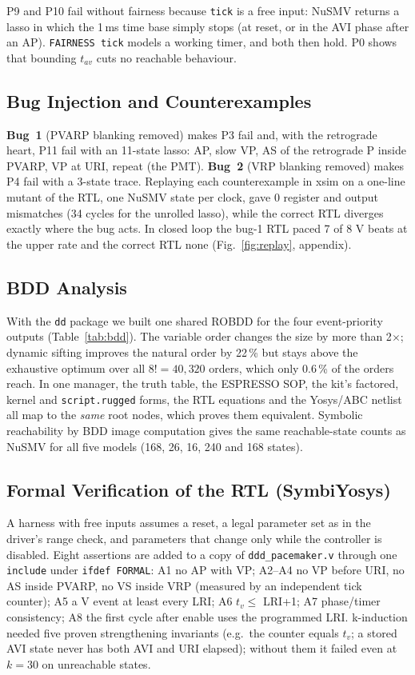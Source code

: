 \documentclass[11pt,a4paper]{article}
\begin{document}
P9 and P10 fail without fairness because \texttt{tick} is a free input: NuSMV returns a lasso in
which the 1\,ms time base simply stops (at reset, or in the AVI phase after an AP).
\texttt{FAIRNESS tick} models a working timer, and both then hold. P0 shows that bounding $t_{av}$
cuts no reachable behaviour.

\subsection{Bug Injection and Counterexamples}
\textbf{Bug~1} (PVARP blanking removed) makes P3 fail and, with the retrograde heart, P11 fail with
an 11-state lasso: AP, slow VP, AS of the retrograde P inside PVARP, VP at URI, repeat (the PMT).
\textbf{Bug~2} (VRP blanking removed) makes P4 fail with a 3-state trace. Replaying each
counterexample in xsim on a one-line mutant of the RTL, one NuSMV state per clock, gave 0 register
and output mismatches (34 cycles for the unrolled lasso), while the correct RTL diverges exactly where
the bug acts. In closed loop the bug-1 RTL paced 7 of 8 V beats at the upper rate and the correct RTL
none (Fig.~\ref{fig:replay}, appendix).

\subsection{BDD Analysis}
With the \texttt{dd} package we built one shared ROBDD for the four event-priority outputs
(Table~\ref{tab:bdd}). The variable order changes the size by more than 2$\times$; dynamic
sifting improves the natural order by 22\,\% but stays above the exhaustive optimum over all
$8!=40{,}320$ orders, which only 0.6\,\% of the orders reach. In one manager, the truth table, the
ESPRESSO SOP, the kit's factored, kernel and \texttt{script.rugged} forms, the RTL equations and the
Yosys/ABC netlist all map to the \emph{same} root nodes, which proves them equivalent. Symbolic
reachability by BDD image computation gives the same reachable-state counts as NuSMV for all five
models (168, 26, 16, 240 and 168 states).


\subsection{Formal Verification of the RTL (SymbiYosys)}
A harness with free inputs assumes a reset, a legal parameter set as in the driver's range check,
and parameters that change only while the controller is disabled. Eight assertions are added to a
copy of \texttt{ddd\_pacemaker.v} through one \texttt{\textasciigrave include} under \texttt{\textasciigrave ifdef FORMAL}: A1 no
AP with VP; A2--A4 no VP before URI, no AS inside PVARP, no VS inside VRP (measured by an
independent tick counter); A5 a V event at least every LRI; A6 $t_v\le$ LRI+1; A7 phase/timer
consistency; A8 the first cycle after enable uses the programmed LRI. k-induction needed five
proven strengthening invariants (e.g.\ the counter equals $t_v$; a stored AVI state never has both
AVI and URI elapsed); without them it failed even at $k=30$ on unreachable states.
\end{document}
